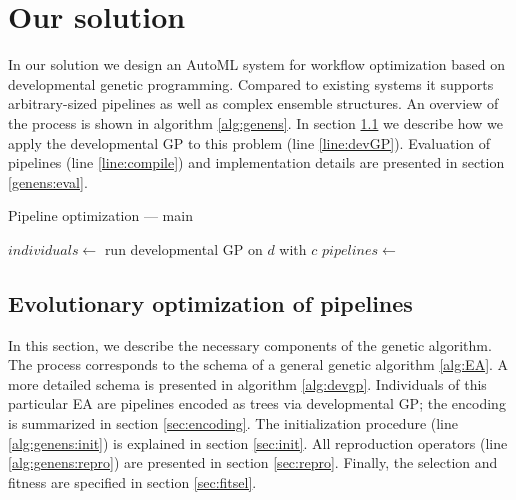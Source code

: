 \chapter{Our solution} \label{our:solution}

In our solution we design an AutoML system for workflow optimization based on
developmental genetic programming. Compared to existing systems it supports 
arbitrary-sized pipelines as well as complex ensemble structures. An overview
of the process is shown in algorithm \ref{alg:genens}. In section
\ref{genens:devGP} we describe how we apply the developmental GP to this
problem (line \ref{line:devGP}). Evaluation of pipelines (line \ref{line:compile})
and implementation details are presented in section \ref{genens:eval}.

\begin{algorithm}
\DontPrintSemicolon 
\caption{Pipeline optimization --- main\label{alg:genens}}
  \;
  $individuals \longleftarrow$ run developmental GP on $d$ with $c$ \label{line:devGP} \;
  $pipelines \longleftarrow$  \label{line:compile}
  \;\;
  
\end{algorithm}








\section{Evolutionary optimization of pipelines} \label{genens:devGP}
In this section, we describe the necessary components of the genetic algorithm.
The process corresponds to the schema of a general genetic algorithm
\ref{alg:EA}. A more detailed schema is presented in algorithm \ref{alg:devgp}.
Individuals of this particular EA are pipelines encoded as trees via
developmental GP; the encoding is summarized in section \ref{sec:encoding}.
The initialization procedure (line \ref{alg:genens:init}) is explained in
section \ref{sec:init}. All reproduction operators
(line \ref{alg:genens:repro}) are presented in section \ref{sec:repro}.
Finally, the selection and fitness are specified in section \ref{sec:fitsel}.

